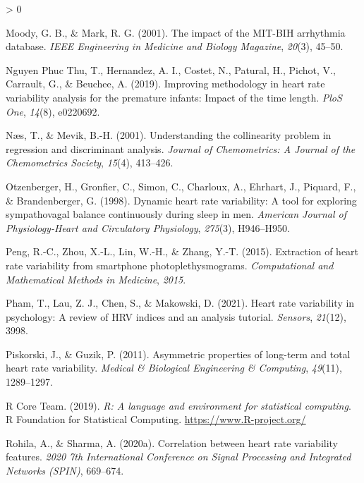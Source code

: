 \documentclass[
  english,
  jou,floatsintext]{apa6}
\newlength{\cslhangindent}
\newenvironment{CSLReferences}[2] %
 {%
  \setlength{\parindent}{0pt}
  \ifodd #1 \everypar{\setlength{\hangindent}{\cslhangindent}}\ignorespaces\fi
  \ifnum #2 > 0
  \setlength{\parskip}{#2\baselineskip}
  \fi
 }%
 {}
\begin{document}
\begin{CSLReferences}{1}{0}
\leavevmode\hypertarget{ref-moody2001impact}{}%
Moody, G. B., \& Mark, R. G. (2001). The impact of the MIT-BIH arrhythmia database. \emph{IEEE Engineering in Medicine and Biology Magazine}, \emph{20}(3), 45--50.

\leavevmode\hypertarget{ref-nguyen2019improving}{}%
Nguyen Phuc Thu, T., Hernandez, A. I., Costet, N., Patural, H., Pichot, V., Carrault, G., \& Beuchee, A. (2019). Improving methodology in heart rate variability analysis for the premature infants: Impact of the time length. \emph{PloS One}, \emph{14}(8), e0220692.

\leavevmode\hypertarget{ref-naes2001understanding}{}%
Næs, T., \& Mevik, B.-H. (2001). Understanding the collinearity problem in regression and discriminant analysis. \emph{Journal of Chemometrics: A Journal of the Chemometrics Society}, \emph{15}(4), 413--426.

\leavevmode\hypertarget{ref-otzenberger1998dynamic}{}%
Otzenberger, H., Gronfier, C., Simon, C., Charloux, A., Ehrhart, J., Piquard, F., \& Brandenberger, G. (1998). Dynamic heart rate variability: A tool for exploring sympathovagal balance continuously during sleep in men. \emph{American Journal of Physiology-Heart and Circulatory Physiology}, \emph{275}(3), H946--H950.

\leavevmode\hypertarget{ref-peng2015extraction}{}%
Peng, R.-C., Zhou, X.-L., Lin, W.-H., \& Zhang, Y.-T. (2015). Extraction of heart rate variability from smartphone photoplethysmograms. \emph{Computational and Mathematical Methods in Medicine}, \emph{2015}.

\leavevmode\hypertarget{ref-pham2021heart}{}%
Pham, T., Lau, Z. J., Chen, S., \& Makowski, D. (2021). Heart rate variability in psychology: A review of HRV indices and an analysis tutorial. \emph{Sensors}, \emph{21}(12), 3998.

\leavevmode\hypertarget{ref-piskorski2011asymmetric}{}%
Piskorski, J., \& Guzik, P. (2011). Asymmetric properties of long-term and total heart rate variability. \emph{Medical \& Biological Engineering \& Computing}, \emph{49}(11), 1289--1297.

\leavevmode\hypertarget{ref-R-base}{}%
R Core Team. (2019). \emph{R: A language and environment for statistical computing}. R Foundation for Statistical Computing. \url{https://www.R-project.org/}

\leavevmode\hypertarget{ref-rohila2020correlation}{}%
Rohila, A., \& Sharma, A. (2020a). Correlation between heart rate variability features. \emph{2020 7th International Conference on Signal Processing and Integrated Networks (SPIN)}, 669--674.


\end{CSLReferences}
\end{document}

